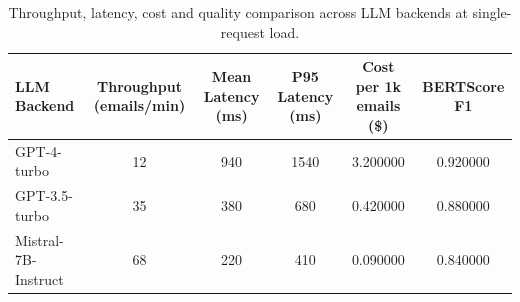 \begin{table}
\caption{Throughput, latency, cost and quality comparison across LLM backends at single-request load.}
\label{tab:tab09_llm_cost_performance}
\begin{tabular}{lccccc}
\toprule
LLM Backend & Throughput (emails/min) & Mean Latency (ms) & P95 Latency (ms) & Cost per 1k emails (\$) & BERTScore F1 \\
\midrule
GPT-4-turbo & 12 & 940 & 1540 & 3.200000 & 0.920000 \\
GPT-3.5-turbo & 35 & 380 & 680 & 0.420000 & 0.880000 \\
Mistral-7B-Instruct & 68 & 220 & 410 & 0.090000 & 0.840000 \\
\bottomrule
\end{tabular}
\end{table}
